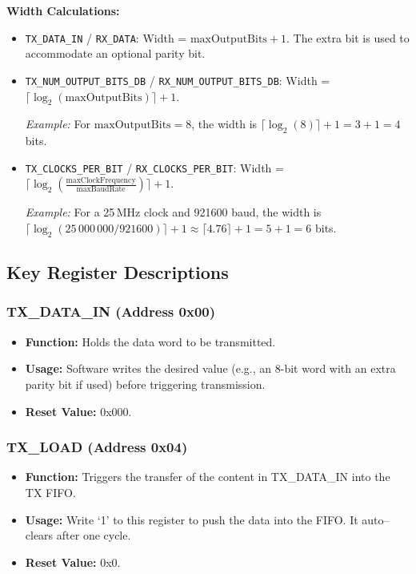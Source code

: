 \textbf{Width Calculations:}
\begin{itemize}
    \item \texttt{TX\_DATA\_IN} / \texttt{RX\_DATA}: Width = \(\text{maxOutputBits}+1\). The extra bit is used to accommodate an optional parity bit.
    \item \texttt{TX\_NUM\_OUTPUT\_BITS\_DB} / \texttt{RX\_NUM\_OUTPUT\_BITS\_DB}: Width = \(\lceil\log_2(\text{maxOutputBits})\rceil+1\).

    \textit{Example:} For \(\text{maxOutputBits}=8\), the width is \(\lceil\log_2(8)\rceil+1 = 3+1 = 4\) bits.

    \item \texttt{TX\_CLOCKS\_PER\_BIT} / \texttt{RX\_CLOCKS\_PER\_BIT}: Width = \(\lceil\log_2(\tfrac{\text{maxClockFrequency}}{\text{maxBaudRate}})\rceil+1\).

    \textit{Example:} For a 25\,MHz clock and 921600 baud, the width is \(\lceil\log_2(25\,000\,000/921600)\rceil+1 \approx \lceil4.76\rceil+1 = 5+1 = 6\) bits.
\end{itemize}

\subsection{Key Register Descriptions}

\subsubsection{TX\_DATA\_IN (Address 0x00)}
\begin{itemize}[noitemsep]
    \item \textbf{Function:} Holds the data word to be transmitted.
    \item \textbf{Usage:} Software writes the desired value (e.g., an 8-bit word with an extra parity bit if used) before triggering transmission.
    \item \textbf{Reset Value:} 0x000.
\end{itemize}

\subsubsection{TX\_LOAD (Address 0x04)}
\begin{itemize}[noitemsep]
    \item \textbf{Function:} Triggers the transfer of the content in TX\_DATA\_IN into the TX FIFO.
    \item \textbf{Usage:} Write ‘1’ to this register to push the data into the FIFO. It auto–clears after one cycle.
    \item \textbf{Reset Value:} 0x0.
\end{itemize}

